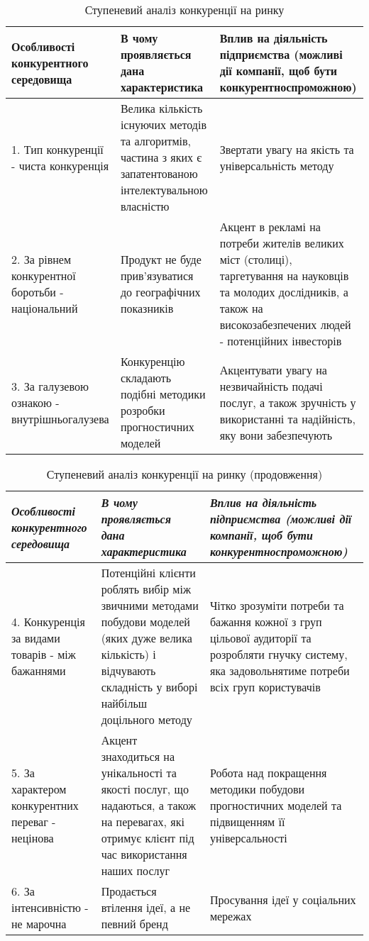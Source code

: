 \begin{table}[H]
\fontsize{12pt}{12pt}\selectfont
	\begin{tabularx}{\textwidth}{|X|X|X|}
    \hline
    Особливості конкурентного середовища & В чому проявляється дана характеристика & Вплив на діяльність підприємства (можливі дії компанії, щоб бути конкурентноспроможною) \\ \hline
    1. Тип конкуренції - чиста конкуренція & Велика кількість існуючих методів та алгоритмів, частина з яких є запатентованою інтелектувальною власністю & Звертати увагу на якість та універсальність методу \\ \hline 
    2. За рівнем конкурентної боротьби - національний & Продукт не буде прив'язуватися до географічних показників & Акцент в рекламі на потреби жителів великих міст (столиці), таргетування на науковців та молодих дослідників, а також на високозабезпечених людей - потенційних інвесторів \\ \hline 
    3. За галузевою ознакою - внутрішньогалузева & Конкуренцію складають подібні методики розробки прогностичних моделей & Акцентувати увагу на незвичайність подачі послуг, а також зручність у використанні та надійність, яку вони забезпечують \\
    \hline
    \end{tabularx}
\caption{Ступеневий аналіз конкуренції на ринку} \label{tab:stab_4_1}
\end{table}

\begin{table}[H]
\fontsize{12pt}{12pt}\selectfont
    \begin{tabularx}{\textwidth}{|X|X|X|}
    \hline
    \textit{Особливості конкурентного середовища} & \textit{В чому проявляється дана характеристика} & \textit{Вплив на діяльність підприємства (можливі дії компанії, щоб бути конкурентноспроможною)} \\ \hline
    4. Конкуренція за видами товарів - між бажаннями & Потенційні клієнти роблять вибір між звичними методами побудови моделей (яких дуже велика кількість) і відчувають складність у виборі найбільш доцільного методу & Чітко зрозуміти потреби та бажання кожної з груп цільової аудиторії та розробляти гнучку систему, яка задовольнятиме потреби всіх груп користувачів \\ \hline 
    5. За характером конкурентних переваг - нецінова & Акцент знаходиться на унікальності та якості послуг, що надаються, а також на перевагах, які отримує клієнт під час використання наших послуг & Робота над покращення методики побудови прогностичних моделей та підвищенням її універсальності \\ \hline 
    6. За інтенсивністю - не марочна & Продається втілення ідеї, а не певний бренд & Просування ідеї у соціальних мережах \\
    \hline
    \end{tabularx}
\caption{Ступеневий аналіз конкуренції на ринку (продовження)} \label{tab:stab_4_2}
\end{table}


